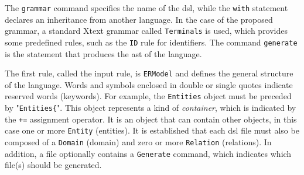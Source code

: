 The \texttt{grammar} command specifies the name of the \ac{dsl}, while the \texttt{with} statement declares an inheritance from another language.
In the case of the proposed grammar, a standard Xtext grammar called \texttt{Terminals} is used, which provides some predefined rules, such as the \texttt{ID} rule for identifiers.
The command \texttt{generate} is the statement that produces the \ac{ast} of the language.

The first rule, called the input rule, is \texttt{ERModel} and defines the general structure of the language.
Words and symbols enclosed in double or single quotes indicate reserved words (keywords).
For example, the \texttt{Entities} object must be preceded by "\texttt{Entities\{}".
This object represents a kind of \textit{container}, which is indicated by the \texttt{+=} assignment operator.
It is an object that can contain other objects, in this case one or more \texttt{Entity} (entities).
It is established that each \ac{dsl} file must also be composed of a \texttt{Domain} (domain) and zero or more \texttt{Relation} (relations).
In addition, a file optionally contains a \texttt{Generate} command, which indicates which file(s) should be generated.


